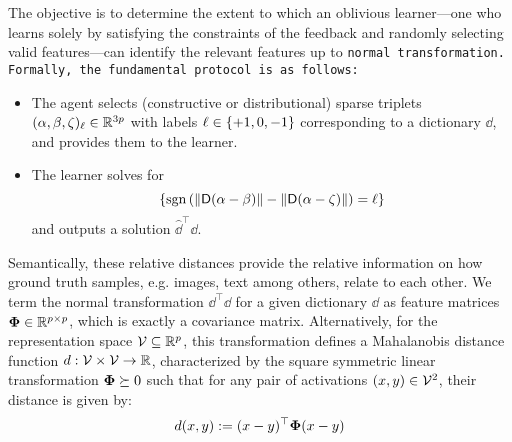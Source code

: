 The objective is to determine the extent to which an oblivious learner—one who learns solely by satisfying the constraints of the feedback and randomly selecting valid features—can identify the relevant features up to \tt{normal transformation}. Formally, the fundamental protocol is as follows:
\begin{itemize}
    \item The agent selects (constructive or distributional) sparse triplets $(\alpha, \beta, \zeta)_{\ell} \in \mathbb{R}^{3p}$ with labels $\ell \in \left\{+1, 0, -1\right\}$ corresponding to a dictionary $\dd$, and provides them to the learner.
    
    \item The learner solves for
    $$
    \curlybracket{ \sgn{\| \dd (\alpha - \beta) \| - \| \dd (\alpha - \zeta) \|} = \ell }\vspace{-2mm}
    $$
    and outputs a solution $\hat{\dd}^\top\hat{\dd}$. 
\end{itemize}
Semantically, these relative distances provide the relative information on how ground truth samples, e.g. images, text among others, relate to each other.
We term the normal transformation $\dd^\top\dd$ for a given dictionary $\dd$ as feature matrices $\boldsymbol{\Phi} \in \mathbb{R}^{p \times p}$, which is exactly a covariance matrix. 
Alternatively, for the representation space ${\mathcal{V}} \subseteq \mathbb{R}^p$, this transformation defines a  Mahalanobis distance function $d: {\mathcal{V}} \times {\mathcal{V}} \to \mathbb{R}$, characterized by the square symmetric linear transformation $\boldsymbol{\Phi} \succeq 0$ such that for any pair of activations $(x,y) \in {\mathcal{V}}^{2}$, their distance is given by:
\begin{align*}
d(x,y) := (x - y)^{\top} \boldsymbol{\Phi} (x-y)
\end{align*}

